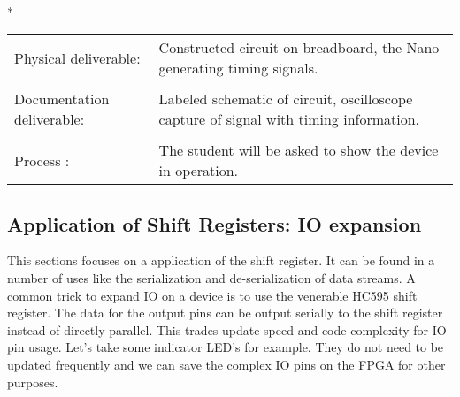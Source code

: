     \vspace{15px}
    \begin{centering}
      \begin{fminipage}{.45\textwidth}
        \vspace{3px}
        \\*
        \vspace{10px}
        \begin{tabular}{p{1.8cm}  p{5.4cm}}
          \raggedright Physical deliverable:         & Constructed circuit on breadboard,  the Nano generating timing signals.\\
          \\
          \raggedright Documentation deliverable:    & Labeled schematic of circuit,  oscilloscope capture of signal with timing information.\\
          \\
          Process :                                  & The student will be asked to show the device in operation.

        \end{tabular}
      \end{fminipage}
    \end{centering} 

  \subsection{Application of Shift Registers: IO expansion}
    This sections focuses on a application of the shift register. It can be found in a number of uses like the serialization and de-serialization of data streams. A common trick to expand IO on a device is to use the venerable HC595 shift register. The data for the output pins can be output serially to the shift register instead of directly parallel. This trades update speed and code complexity for IO pin usage. Let's take some indicator LED's for example. They do not need to be updated frequently and we can save the complex IO pins on the FPGA for other purposes. 

